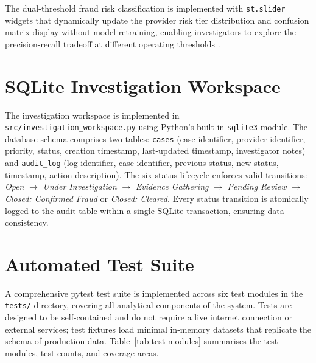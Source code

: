 The dual-threshold fraud risk classification is implemented with \texttt{st.slider} widgets that dynamically update the provider risk tier distribution and confusion matrix display without model retraining, enabling investigators to explore the precision-recall tradeoff at different operating thresholds \cite{b4}.

\section{SQLite Investigation Workspace}
\label{sec:impl-sqlite}

The investigation workspace is implemented in \texttt{src/investigation\_workspace.py} using Python's built-in \texttt{sqlite3} module. The database schema comprises two tables: \texttt{cases} (case identifier, provider identifier, priority, status, creation timestamp, last-updated timestamp, investigator notes) and \texttt{audit\_log} (log identifier, case identifier, previous status, new status, timestamp, action description). The six-status lifecycle enforces valid transitions: \textit{Open} $\rightarrow$ \textit{Under Investigation} $\rightarrow$ \textit{Evidence Gathering} $\rightarrow$ \textit{Pending Review} $\rightarrow$ \textit{Closed: Confirmed Fraud} or \textit{Closed: Cleared}. Every status transition is atomically logged to the audit table within a single SQLite transaction, ensuring data consistency.

\section{Automated Test Suite}
\label{sec:impl-testing}

A comprehensive pytest test suite is implemented across six test modules in the \texttt{tests/} directory, covering all analytical components of the system. Tests are designed to be self-contained and do not require a live internet connection or external services; test fixtures load minimal in-memory datasets that replicate the schema of production data. Table~\ref{tab:test-modules} summarises the test modules, test counts, and coverage areas.

